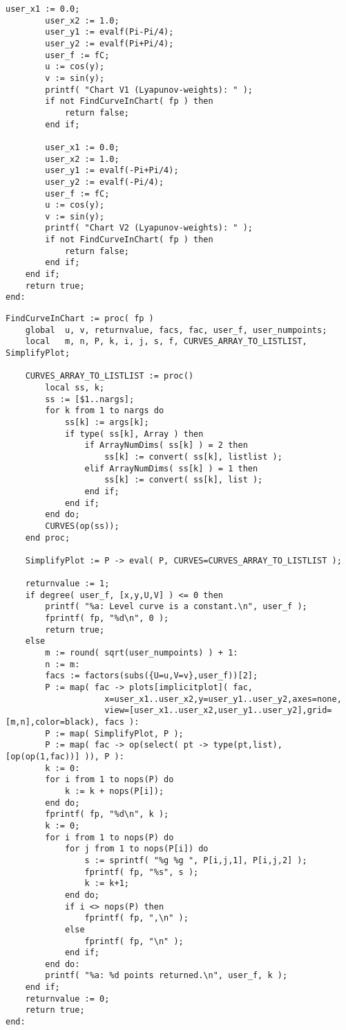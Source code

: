 \documentclass[a4paper,10pt]{article}
\begin{document}
\begin{lstlisting}[name=p5curves]
        user_x1 := 0.0;
        user_x2 := 1.0;
        user_y1 := evalf(Pi-Pi/4);
        user_y2 := evalf(Pi+Pi/4);
        user_f := fC;
        u := cos(y);
        v := sin(y);
        printf( "Chart V1 (Lyapunov-weights): " );
        if not FindCurveInChart( fp ) then
            return false;
        end if;

        user_x1 := 0.0;
        user_x2 := 1.0;
        user_y1 := evalf(-Pi+Pi/4);
        user_y2 := evalf(-Pi/4);
        user_f := fC;
        u := cos(y);
        v := sin(y);
        printf( "Chart V2 (Lyapunov-weights): " );
        if not FindCurveInChart( fp ) then
            return false;
        end if;
    end if;
    return true;
end:
\end{lstlisting}

\begin{lstlisting}[name=p5curves]
FindCurveInChart := proc( fp )
    global  u, v, returnvalue, facs, fac, user_f, user_numpoints;
    local   m, n, P, k, i, j, s, f, CURVES_ARRAY_TO_LISTLIST, SimplifyPlot;

    CURVES_ARRAY_TO_LISTLIST := proc()
        local ss, k;
        ss := [$1..nargs];
        for k from 1 to nargs do
            ss[k] := args[k];
            if type( ss[k], Array ) then
                if ArrayNumDims( ss[k] ) = 2 then
                    ss[k] := convert( ss[k], listlist );
                elif ArrayNumDims( ss[k] ) = 1 then
                    ss[k] := convert( ss[k], list );
                end if;
            end if;
        end do;
        CURVES(op(ss));
    end proc;

    SimplifyPlot := P -> eval( P, CURVES=CURVES_ARRAY_TO_LISTLIST );

    returnvalue := 1;
    if degree( user_f, [x,y,U,V] ) <= 0 then
        printf( "%a: Level curve is a constant.\n", user_f );
        fprintf( fp, "%d\n", 0 );
        return true;
    else
        m := round( sqrt(user_numpoints) ) + 1:
        n := m:
        facs := factors(subs({U=u,V=v},user_f))[2];
        P := map( fac -> plots[implicitplot]( fac,
                    x=user_x1..user_x2,y=user_y1..user_y2,axes=none,
                    view=[user_x1..user_x2,user_y1..user_y2],grid=[m,n],color=black), facs ):
        P := map( SimplifyPlot, P );
        P := map( fac -> op(select( pt -> type(pt,list), [op(op(1,fac))] )), P ):
        k := 0:
        for i from 1 to nops(P) do
            k := k + nops(P[i]);
        end do;
        fprintf( fp, "%d\n", k );
        k := 0;
        for i from 1 to nops(P) do
            for j from 1 to nops(P[i]) do
                s := sprintf( "%g %g ", P[i,j,1], P[i,j,2] );
                fprintf( fp, "%s", s );
                k := k+1;
            end do;
            if i <> nops(P) then
                fprintf( fp, ",\n" );
            else
                fprintf( fp, "\n" );
            end if;
        end do:
        printf( "%a: %d points returned.\n", user_f, k );
    end if;
    returnvalue := 0;
    return true;
end:
\end{lstlisting}
\end{document}
